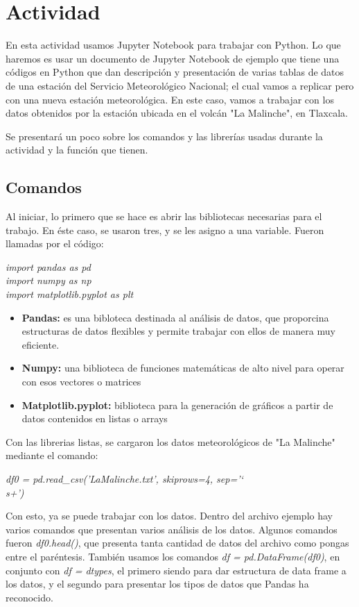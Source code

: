\documentclass[a4paper]{article}
\begin{document}
\section{Actividad}
En esta actividad usamos Jupyter Notebook para trabajar con Python. Lo que haremos es usar un documento de Jupyter Notebook de ejemplo que tiene una códigos en Python que dan descripción y presentación de varias tablas de datos de una estación del Servicio Meteorológico Nacional; el cual vamos a replicar pero con una nueva estación meteorológica. En este caso, vamos a trabajar con los datos obtenidos por la estación ubicada en el volcán "La Malinche", en Tlaxcala. 

Se presentará un poco sobre los comandos y las librerías usadas durante la actividad y la función que tienen.

\subsection{Comandos}

Al iniciar, lo primero que se hace es abrir las bibliotecas necesarias para el trabajo. En éste caso, se usaron tres, y se les asigno a una variable. Fueron llamadas por el código:

\begin{center}
\textit{import pandas as pd \\ import numpy as np \\ import matplotlib.pyplot as plt}
\end{center}

\begin{itemize}
\item \textbf{Pandas:} es una bibloteca destinada al análisis de datos, que proporcina estructuras de datos flexibles y permite trabajar con ellos de manera muy eficiente. 
\item \textbf{Numpy:} una biblioteca de funciones matemáticas de alto nivel para operar con esos vectores o matrices
\item \textbf{Matplotlib.pyplot:}  biblioteca para la generación de gráficos a partir de datos contenidos en listas o arrays
\end{itemize}

\bigskip

Con las librerias listas, se cargaron los datos meteorológicos de "La Malinche" mediante el comando: 
\begin{center}
\textit{df0 = pd.read\_csv('LaMalinche.txt', skiprows=4, sep='\char`\\ s+')}
\end{center}
Con esto, ya se puede trabajar con los datos. Dentro del archivo ejemplo hay varios comandos que presentan varios análisis de los datos. Algunos comandos fueron \textit{df0.head()}, que presenta tanta cantidad de datos del archivo como pongas entre el paréntesis. También usamos los comandos \textit{df = pd.DataFrame(df0)}, en conjunto con \textit{df = dtypes}, el primero siendo para dar estructura de data frame a los datos, y el segundo para presentar los tipos de datos que Pandas ha reconocido.
\end{document}
